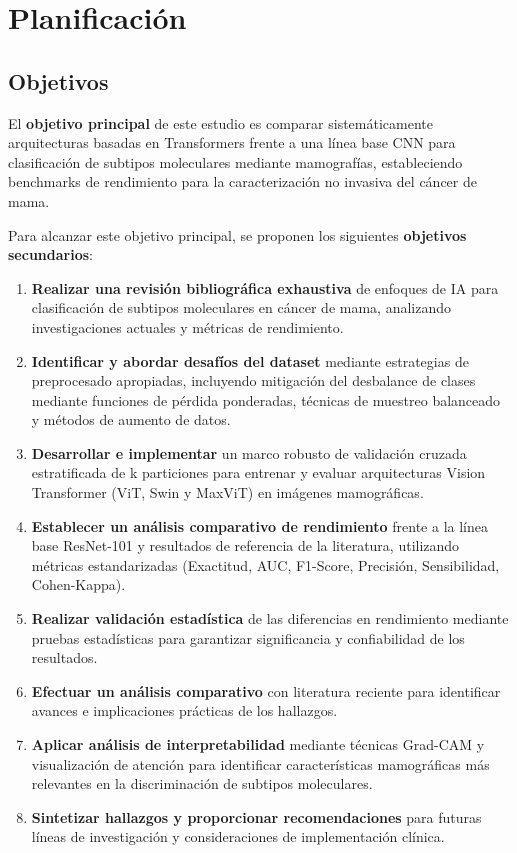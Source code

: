 \documentclass[a4paper,10pt]{book}
\begin{document}
\section{Planificación}

\subsection{Objetivos}

El \textbf{objetivo principal} de este estudio es comparar sistemáticamente arquitecturas basadas en Transformers frente a una línea base CNN para clasificación de subtipos moleculares mediante mamografías, estableciendo benchmarks de rendimiento para la caracterización no invasiva del cáncer de mama.

Para alcanzar este objetivo principal, se proponen los siguientes \textbf{objetivos secundarios}:

\begin{enumerate}
\item \textbf{Realizar una revisión bibliográfica exhaustiva} de enfoques de IA para clasificación de subtipos moleculares en cáncer de mama, analizando investigaciones actuales y métricas de rendimiento.
\item \textbf{Identificar y abordar desafíos del dataset} mediante estrategias de preprocesado apropiadas, incluyendo mitigación del desbalance de clases mediante funciones de pérdida ponderadas, técnicas de muestreo balanceado y métodos de aumento de datos.
\item \textbf{Desarrollar e implementar} un marco robusto de validación cruzada estratificada de k particiones para entrenar y evaluar arquitecturas Vision Transformer (ViT, Swin y MaxViT) en imágenes mamográficas.
\item \textbf{Establecer un análisis comparativo de rendimiento} frente a la línea base ResNet-101 y resultados de referencia de la literatura, utilizando métricas estandarizadas (Exactitud, AUC, F1-Score, Precisión, Sensibilidad, Cohen-Kappa).
\item \textbf{Realizar validación estadística} de las diferencias en rendimiento mediante pruebas estadísticas para garantizar significancia y confiabilidad de los resultados.
\item \textbf{Efectuar un análisis comparativo} con literatura reciente para identificar avances e implicaciones prácticas de los hallazgos.
\item \textbf{Aplicar análisis de interpretabilidad} mediante técnicas Grad-CAM y visualización de atención para identificar características mamográficas más relevantes en la discriminación de subtipos moleculares.
\item \textbf{Sintetizar hallazgos y proporcionar recomendaciones} para futuras líneas de investigación y consideraciones de implementación clínica.
\end{enumerate}
\end{document}

